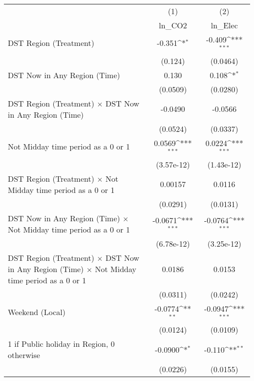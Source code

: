 {
\def\sym#1{\ifmmode^{#1}\else\(^{#1}\)\fi}
\begin{tabular}{l*{2}{c}}
\hline\hline
                    &\multicolumn{1}{c}{(1)}&\multicolumn{1}{c}{(2)}\\
                    &\multicolumn{1}{c}{ln\_CO2}&\multicolumn{1}{c}{ln\_Elec}\\
\hline
DST Region (Treatment)&      -0.351\sym{*}  &      -0.409\sym{***}\\
                    &     (0.124)         &    (0.0464)         \\
[1em]
DST Now in Any Region (Time)&       0.130         &       0.108\sym{*}  \\
                    &    (0.0509)         &    (0.0280)         \\
[1em]
DST Region (Treatment) $\times$ DST Now in Any Region (Time)&     -0.0490         &     -0.0566         \\
                    &    (0.0524)         &    (0.0337)         \\
[1em]
Not Midday time period as a 0 or 1&      0.0569\sym{***}&      0.0224\sym{***}\\
                    &  (3.57e-12)         &  (1.43e-12)         \\
[1em]
DST Region (Treatment) $\times$ Not Midday time period as a 0 or 1&     0.00157         &      0.0116         \\
                    &    (0.0291)         &    (0.0131)         \\
[1em]
DST Now in Any Region (Time) $\times$ Not Midday time period as a 0 or 1&     -0.0671\sym{***}&     -0.0764\sym{***}\\
                    &  (6.78e-12)         &  (3.25e-12)         \\
[1em]
DST Region (Treatment) $\times$ DST Now in Any Region (Time) $\times$ Not Midday time period as a 0 or 1&      0.0186         &      0.0153         \\
                    &    (0.0311)         &    (0.0242)         \\
[1em]
Weekend (Local)     &     -0.0774\sym{**} &     -0.0947\sym{***}\\
                    &    (0.0124)         &    (0.0109)         \\
[1em]
1 if Public holiday in Region, 0 otherwise&     -0.0900\sym{*}  &      -0.110\sym{**} \\
                    &    (0.0226)         &    (0.0155)         \\

\end{tabular}}
